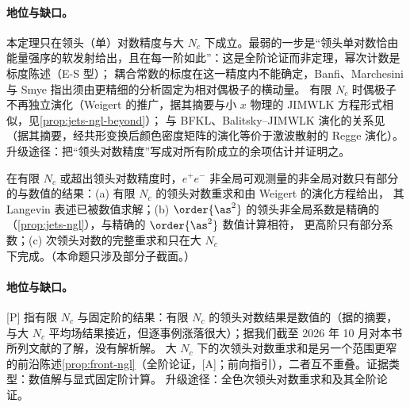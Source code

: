 \paragraph{地位与缺口。}
本定理只在领头（单）对数精度与大 $N_c$ 下成立。最弱的一步是“领头单对数恰由能量强序的软发射给出，且在每一阶如此”：这是全阶论证而非定理，幂次计数是标度陈述（E-S 型）；
耦合常数的标度在这一精度内不能确定，Banfi、Marchesini 与 Smye 指出须由更精细的分析固定为相对偶极子的横动量\cite[第~4~节]{Banfi:2002hw}。
有限 $N_c$ 时偶极子不再独立演化（Weigert 的推广，据其摘要与小 $x$ 物理的 JIMWLK 方程形式相似\cite{Weigert:2003mm}，见\cref{prop:jets-ngl-beyond}）；
与 BFKL、Balitsky--JIMWLK 演化的关系见\cite{Caron-Huot:2015bja}（据其摘要，经共形变换后颜色密度矩阵的演化等价于激波散射的 Regge 演化）。升级途径：把“领头对数精度”写成对所有阶成立的余项估计并证明之。

\begin{proposition}\label{prop:jets-ngl-beyond}
在有限 $N_c$ 或超出领头对数精度时，$e^+e^-$ 非全局可观测量的非全局对数只有部分的与数值的结果：(a) 有限 $N_c$ 的领头对数重求和由 Weigert 的演化方程给出\cite{Weigert:2003mm}，
其 Langevin 表述已被数值求解\cite{Hatta:2013iba}；(b) $\order{\as^2}$ 的领头非全局系数是精确的（\cref{prop:jets-ngl}），与精确的 $\order{\as^2}$ 数值计算相符\cite[第~4~节]{DasguptaSalam2001}，
更高阶只有部分系数；(c) 次领头对数的完整重求和只在大 $N_c$ 下完成。（本命题只涉及部分子截面。）
\end{proposition}

\paragraph{地位与缺口。}
[P] 指有限 $N_c$ 与固定阶的结果：有限 $N_c$ 的领头对数结果是数值的（据\cite{Hatta:2013iba}的摘要，与大 $N_c$ 平均场结果接近，但逐事例涨落很大）；据我们截至 2026 年 10 月对本书所列文献的了解，没有解析解。
大 $N_c$ 下的次领头对数重求和是另一个范围更窄的前沿陈述\cref{prop:front-ngl}（全阶论证，[A]；前向指引），二者互不重叠。证据类型：数值解与显式固定阶计算。
升级途径：全色次领头对数重求和及其全阶论证。

